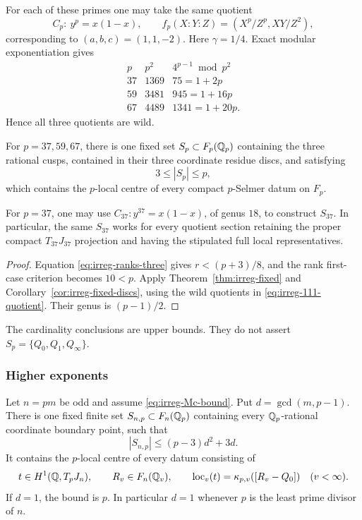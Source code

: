For each of these primes one may take the same quotient
\begin{equation}
 C_p:\ y^p=x(1-x),\qquad
 f_p(X:Y:Z)=(X^p/Z^p,XY/Z^2),
 \label{eq:irreg-111-quotient}
\end{equation}
corresponding to \((a,b,c)=(1,1,-2)\). Here \(\gamma=1/4\).
Exact modular exponentiation gives
\begin{equation}
 \begin{array}{c|c|c}
 p&p^2&4^{p-1}\bmod p^2\\ \hline
 37&1369&75=1+2p\\
 59&3481&945=1+16p\\
 67&4489&1341=1+20p.
 \end{array}
 \label{eq:irreg-wild-table}
\end{equation}
Hence all three quotients are wild.

\begin{corollary}\label{cor:irreg-37-59-67}
For \(p=37,59,67\), there is one fixed set \(S_p\subset F_p(\mathbb Q_p)\)
containing the three rational cusps, contained in their three
coordinate residue discs, and satisfying
\[
 3\leq |S_p|\leq p,
\]
which contains the \(p\)-local centre of every compact
\(p\)-Selmer datum on \(F_p\).

For \(p=37\), one may use \(C_{37}:y^{37}=x(1-x)\), of genus \(18\),
to construct \(S_{37}\). In particular, the same \(S_{37}\) works for
every quotient section retaining the proper compact \(T_{37}J_{37}\)
projection and having the stipulated full local representatives.
\end{corollary}

\begin{proof}
Equation \eqref{eq:irreg-ranks-three} gives
\(r<(p+3)/8\), and the rank first-case criterion becomes \(10<p\).
Apply Theorem~\ref{thm:irreg-fixed} and
Corollary~\ref{cor:irreg-fixed-discs}, using the wild quotients in
\eqref{eq:irreg-111-quotient}. Their genus is \((p-1)/2\).
\end{proof}

The cardinality conclusions are upper bounds. They do not assert
\(S_p=\{Q_0,Q_1,Q_\infty\}\).

\subsubsection{Higher exponents}

\begin{corollary}\label{cor:irreg-higher-fixed}
Let \(n=pm\) be odd and assume \eqref{eq:irreg-Mc-bound}. Put
\(d=\gcd(m,p-1)\). There is one fixed finite set
\(S_{n,p}\subset F_n(\mathbb Q_p)\) containing every \(\mathbb Q_p\)-rational
coordinate boundary point, such that
\begin{equation}
 |S_{n,p}|\leq(p-3)d^2+3d.
 \label{eq:irreg-higher-bound}
\end{equation}
It contains the \(p\)-local centre of every datum consisting of
\[
 t\in H^1(\mathbb Q,T_pJ_n),\qquad R_v\in F_n(\mathbb Q_v),
 \qquad
 \operatorname{loc}_v(t)=\kappa_{p,v}([R_v-Q_0])
 \quad(v<\infty).
\]
If \(d=1\), the bound is \(p\). In particular \(d=1\) whenever
\(p\) is the least prime divisor of \(n\).
\end{corollary}

